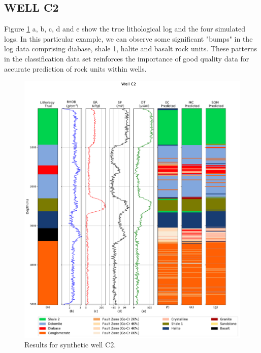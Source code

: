 \documentclass[preprint,12pt]{elsarticle}
\begin{document}
\subsection{WELL C2}
\label{subsub:C2}
Figure \ref{fig:well_C2} a, b, c, d and e show the true lithological log and the four simulated logs. In this particular example, we can observe some significant "bumps" in the log data comprising diabase, shale 1, halite and basalt rock units. These patterns in the classification data set reinforces the importance of good quality data for accurate prediction of rock units within wells.  
 
\begin{figure}[!htb]
	\centering
	\includegraphics[scale=0.4]{imagens/wellC2nx80v02.pdf}
	\caption{Results for synthetic well C2.  }
	\label{fig:well_C2}
\end{figure}
\end{document}

